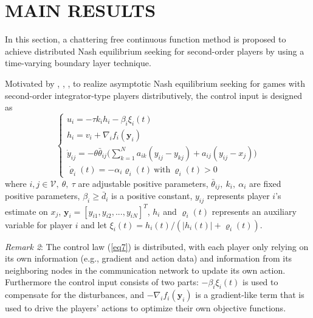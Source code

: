 \documentclass[lettersize,journal]{IEEEtran}
\begin{document}
\section{MAIN RESULTS}
In this section, a chattering free continuous function method is proposed to achieve distributed Nash equilibrium seeking for second-order players by using a time-varying boundary layer technique.

Motivated by \cite{7888532}, \cite{9696299}, \cite{10192924}, to realize asymptotic Nash equilibrium seeking for games with second-order integrator-type players distributively, the control input is designed as
\begin{equation}\label{eq7}
    \begin{cases}
        u_i=-\tau k_ih_i-\beta_i\xi_i(t)                                                                      \\
        h_i=v_i+\nabla_if_i(\mathbf{y}_i)                                                                     \\
        \dot{y}_{ij}=-\theta\bar{\theta}_{ij}\Bigg(\sum_{k=1}^Na_{ik}(y_{ij}-y_{kj})+a_{ij}(y_{ij}-x_j)\Bigg) \\
        \dot{\varrho}_i(t) = -\alpha_i \varrho_i(t)~\text{with}~\varrho_i(t) > 0
    \end{cases}
\end{equation}
where $i,j \in \mathcal{V},~ \theta, ~\tau$ are adjustable positive parameters, $\bar{\theta}_{ij},~ k_i,~ \alpha_i$ are fixed positive parameters, $\beta_i \geq \bar{d}_i$ is a positive constant, $y_{ij}$ represents player $i$'s estimate on $x_j$, $\mathbf{y}_i = [y_{i1}, y_{i2},..., y_{iN}]^T$, $h_i$ and $\varrho_i(t)$ represents an auxiliary variable for player $i$ and let $\xi_i(t) = h_i(t)/(|h_i(t)| + \varrho_i(t))$.

\emph{Remark 2}: The control law (\ref{eq7}) is distributed, with each player only relying on its own information (e.g., gradient and action data) and information from its neighboring nodes in the communication network to update its own action. Furthermore the control input consists of two parts: $-\beta_i\xi_i(t)$ is used to compensate for the disturbances, and $-\nabla_if_i(\mathbf{y}_i)$ is a gradient-like term that is used to drive the players' actions to optimize their own objective functions.
\end{document}
